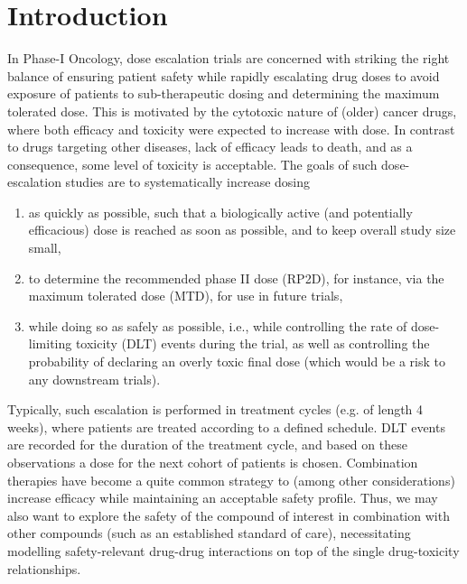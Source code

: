 \documentclass[AMA,STIX1COL]{WileyNJD-v2}
\begin{document}


\maketitle


\newpage
\section{Introduction}\label{sec1}
In Phase-I Oncology, dose escalation trials are concerned with striking the right balance of ensuring patient safety while rapidly escalating drug doses to avoid exposure of patients to sub-therapeutic dosing and determining the maximum tolerated dose\cite{LeTourneau2009}. This is motivated by the cytotoxic nature of (older) cancer drugs, where both efficacy and toxicity were expected to increase with dose. In contrast to drugs targeting other diseases, lack of efficacy leads to death, and as a consequence, some level of toxicity is acceptable. 
The goals of such dose-escalation studies are to systematically increase dosing
\begin{enumerate}
\item as quickly as possible, such that a biologically active (and potentially efficacious) dose is reached as soon as possible, and to keep overall study size small,
\item to determine the recommended phase II dose (RP2D), for instance, via the maximum tolerated dose (MTD), for use in future trials\cite{Neuenschwander2014},
\item while doing so as safely as possible, i.e., while controlling the rate of dose-limiting toxicity (DLT) events during the trial, as well as controlling the probability of declaring an overly toxic final dose (which would be a risk to any downstream trials).
\end{enumerate}
Typically, such escalation is performed in treatment cycles (e.g. of length 4 weeks), where patients are treated according to a defined schedule. DLT events are recorded for the duration of the treatment cycle, and based on these observations a dose for the next cohort of patients is chosen. Combination therapies have become a quite common strategy to (among other considerations) increase efficacy \cite{Mokhtari2017, Palmer2017} while maintaining an acceptable safety profile. Thus, we may also want to explore the safety of the compound of interest in combination with other compounds (such as an established standard of care), necessitating modelling safety-relevant drug-drug interactions on top of the single drug-toxicity relationships.
\end{document}
